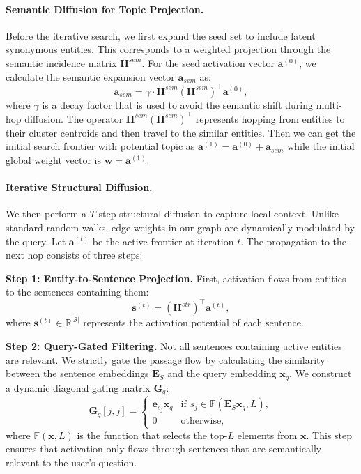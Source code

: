 \paragraph{Semantic Diffusion for Topic Projection.}
Before the iterative search, we first expand the seed set to include latent synonymous entities. This corresponds to a weighted projection through the semantic incidence matrix $\mathbf{H}^{sem}$.
For the seed activation vector $\mathbf{a}^{(0)}$, we calculate the semantic expansion vector $\mathbf{a}_{sem}$ as:
\begin{equation}
    \mathbf{a}_{sem} = \gamma \cdot \mathbf{H}^{sem} (\mathbf{H}^{sem})^\top \mathbf{a}^{(0)},
\end{equation}
where $\gamma$ is a decay factor that is used to avoid the semantic shift during multi-hop diffusion. The operator $\mathbf{H}^{sem} (\mathbf{H}^{sem})^\top$ represents hopping from entities to their cluster centroids and then travel to the similar entities.
Then we can get the initial search frontier with potential topic as $\mathbf{a}^{(1)} = \mathbf{a}^{(0)} + \mathbf{a}_{sem}$ while the initial global weight vector is $\mathbf{w} = \mathbf{a}^{(1)}$.

\paragraph{Iterative Structural Diffusion.}
We then perform a $T$-step structural diffusion to capture local context. Unlike standard random walks, edge weights in our graph are dynamically modulated by the query. Let $\mathbf{a}^{(t)}$ be the active frontier at iteration $t$. The propagation to the next hop consists of three steps:

\textbf{Step 1: Entity-to-Sentence Projection.} First, activation flows from entities to the sentences containing them:
\begin{equation}
    \mathbf{s}^{(t)} = (\mathbf{H}^{str})^\top \mathbf{a}^{(t)},
\end{equation}
where $\mathbf{s}^{(t)} \in \mathbb{R}^{|\mathcal{S}|}$ represents the activation potential of each sentence.

\textbf{Step 2: Query-Gated Filtering.} Not all sentences containing active entities are relevant. We strictly gate the passage flow by calculating the similarity between the sentence embeddings $\mathbf{E}_S$ and the query embedding $\mathbf{x}_q$. We construct a dynamic diagonal gating matrix $\mathbf{G}_q$:
\begin{equation}
    \mathbf{G}_q[j,j] = 
    \begin{cases} 
        \mathbf{e}_{s_j}^\top \mathbf{x}_q & \text{if } s_j \in \mathbb{F}(\mathbf{E}_S \mathbf{x}_q, L), \\
        0 & \text{otherwise},
    \end{cases}
\end{equation}
where $\mathbb{F}(\mathbf{x},L)$ is the function that selects the top-$L$ elements from $\mathbf{x}$. This step ensures that activation only flows through sentences that are semantically relevant to the user's question.

